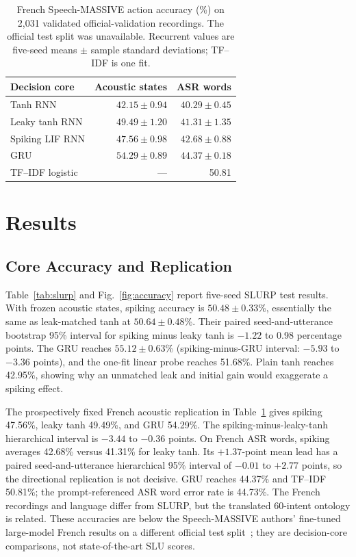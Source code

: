 \documentclass[conference]{IEEEtran}
\begin{document}
\begin{table}[t]
\caption{French Speech-MASSIVE action accuracy (\%) on 2,031 validated official-validation recordings. The official test split was unavailable. Recurrent values are five-seed means $\pm$ sample standard deviations; TF--IDF is one fit.}
\label{tab:french}
\centering\scriptsize
\begin{tabular}{lrr}
\toprule
Decision core & Acoustic states & ASR words\\
\midrule
Tanh RNN & $42.15\pm0.94$ & $40.29\pm0.45$\\
Leaky tanh RNN & $49.49\pm1.20$ & $41.31\pm1.35$\\
Spiking LIF RNN & $47.56\pm0.98$ & $42.68\pm0.88$\\
GRU & $54.29\pm0.89$ & $44.37\pm0.18$\\
TF--IDF logistic & --- & 50.81\\
\bottomrule
\end{tabular}
\end{table}

\section{Results}
\subsection{Core Accuracy and Replication}
Table~\ref{tab:slurp} and Fig.~\ref{fig:accuracy} report five-seed SLURP test results. With frozen acoustic states, spiking accuracy is $50.48\pm0.33$\%, essentially the same as leak-matched tanh at $50.64\pm0.48$\%. Their paired seed-and-utterance bootstrap 95\% interval for spiking minus leaky tanh is $-1.22$ to 0.98 percentage points. The GRU reaches $55.12\pm0.63$\% (spiking-minus-GRU interval: $-5.93$ to $-3.36$ points), and the one-fit linear probe reaches 51.68\%. Plain tanh reaches 42.95\%, showing why an unmatched leak and initial gain would exaggerate a spiking effect.

The prospectively fixed French acoustic replication in Table~\ref{tab:french} gives spiking 47.56\%, leaky tanh 49.49\%, and GRU 54.29\%. The spiking-minus-leaky-tanh hierarchical interval is $-3.44$ to $-0.36$ points. On French ASR words, spiking averages 42.68\% versus 41.31\% for leaky tanh. Its $+1.37$-point mean lead has a paired seed-and-utterance hierarchical 95\% interval of $-0.01$ to $+2.77$ points, so the directional replication is not decisive. GRU reaches 44.37\% and TF--IDF 50.81\%; the prompt-referenced ASR word error rate is 44.73\%. The French recordings and language differ from SLURP, but the translated 60-intent ontology is related. These accuracies are below the Speech-MASSIVE authors' fine-tuned large-model French results on a different official test split~\cite{speechmassive}; they are decision-core comparisons, not state-of-the-art SLU scores.
\end{document}

